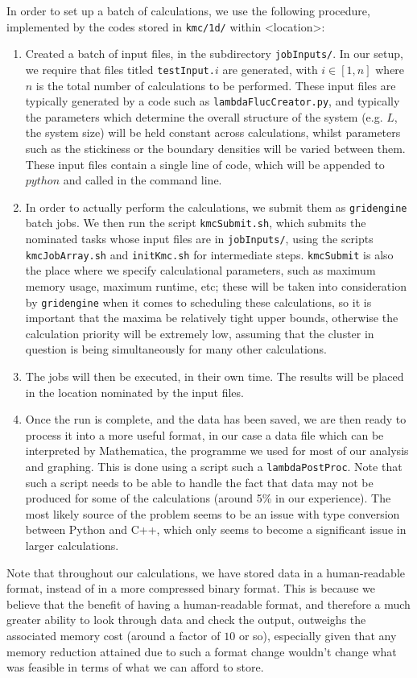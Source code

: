 In order to set up a batch of calculations, we use the following procedure, implemented by the codes
stored in \texttt{kmc/1d/} within <location>:
\begin{enumerate}
 \item Created a batch of input files, in the subdirectory \texttt{jobInputs/}. In our setup, we
 require that files titled
 \texttt{testInput.}$i$ are generated, with $i \in [1, n]$ where $n$ is the total number of 
 calculations to be performed. These input files are typically generated by a code such as 
 \texttt{lambdaFlucCreator.py}, and typically the parameters which determine the overall structure
 of the system (e.g. $L$, the system size) will be held constant across calculations, whilst
 parameters such as the stickiness or the boundary densities will be varied between them. These input files contain a single line of code, which will be appended to $python $ and called in the command line.
 \item In order to actually perform the calculations, we submit them as \texttt{gridengine} batch
 jobs. We then run the script \texttt{kmcSubmit.sh}, which submits the nominated tasks whose input
 files are in \texttt{jobInputs/}, using the scripts \texttt{kmcJobArray.sh} and 
 \texttt{initKmc.sh} for intermediate steps. \texttt{kmcSubmit} is also the place where we specify
 calculational parameters, such as maximum memory usage, maximum runtime, etc; these will be taken
 into consideration by \texttt{gridengine} when it comes to scheduling these calculations, so it
 is important that the maxima be relatively tight upper bounds, otherwise the calculation priority
 will be extremely low, assuming that the cluster in question is being simultaneously for many other
 calculations.
 \item The jobs will then be executed, in their own time. The results will be placed in the location
 nominated by the input files.
 \item Once the run is complete, and the data has been saved, we are then ready to process it into a
 more useful format, in our case a data file which can be interpreted by Mathematica, the programme
 we used for most of our analysis and graphing. This is done using a script such a 
 \texttt{lambdaPostProc}. Note that such
 a script needs to be able to handle the fact that data may not be produced for some of the 
 calculations (around 5\% in our experience). The most likely source of the
 problem seems to be an issue with type conversion between Python and C++, which only seems to 
 become a significant issue in larger calculations.
\end{enumerate}
Note that throughout our calculations, we have stored data in a human-readable format, instead of
in a more compressed binary format. This is because we believe that the benefit of having a 
human-readable format, and therefore a much greater ability to look through data and check the 
output, outweighs the associated memory cost (around a factor of $10$ or so), 
especially given that any memory reduction attained due to such a format change wouldn't change
what was feasible in terms of what we can afford to store.


